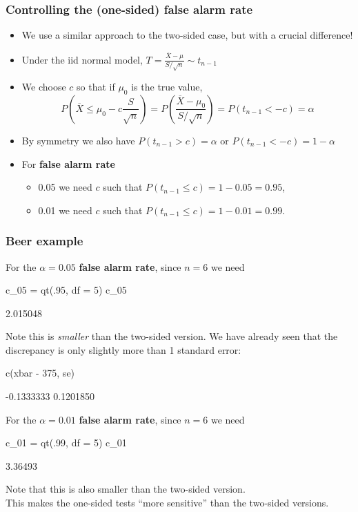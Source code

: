 \documentclass[a4paper]{article}
\begin{document}
\subsubsection{Controlling the (one-sided) false alarm rate}
\begin{itemize}
	\item We use a similar approach to the two-sided case, but with a crucial difference!
	\item Under the iid normal model, \( T = \frac{\overline{X} - \mu}{S / \sqrt{n}} \sim t_{n-1} \)
	\item We choose \( c \) so that if \( \mu_0 \) is the true value,
	\[
		P \left( \overline{X} \leq \mu_0 - c \frac{S}{\sqrt{n}} \right) = P \left( \frac{\overline{X} - \mu_0}{S / \sqrt{n}} \right) = P(t_{n-1} < -c) = \alpha
	\]
	\item By symmetry we also have \( P(t_{n-1} > c) = \alpha \) or \( P(t_{n-1} < -c) = 1 -\alpha \) 
	\item For \textcolor{mygreen}{\textbf{false alarm rate}}
	\begin{itemize}
		\item 0.05 we need \( c \) such that \( P(t_{n-1} \leq c) = 1-0.05 = 0.95 \),
		\item 0.01 we need \( c \) such that \( P(t_{n-1} \leq c) = 1-0.01 = 0.99 \).
	\end{itemize}
\end{itemize}
\subsubsection{Beer example}
For the \( \alpha = 0.05 \) \textcolor{mygreen}{\textbf{false alarm rate}}, since \( n = 6 \) we need
\begin{Schunk}
\begin{Sinput}
c_05 = qt(.95, df = 5)
c_05
\end{Sinput}
\begin{Soutput}
[1] 2.015048
\end{Soutput}
\end{Schunk}
Note this is \textit{smaller} than the two-sided version.
We have already seen that the discrepancy is only slightly more than 1 standard error:
\begin{Schunk}
\begin{Sinput}
c(xbar - 375, se)
\end{Sinput}
\begin{Soutput}
[1] -0.1333333  0.1201850
\end{Soutput}
\end{Schunk}
For the \( \alpha = 0.01 \) \textcolor{mygreen}{\textbf{false alarm rate}}, since \( n = 6 \) we need
\begin{Schunk}
\begin{Sinput}
c_01 = qt(.99, df = 5)
c_01
\end{Sinput}
\begin{Soutput}
[1] 3.36493
\end{Soutput}
\end{Schunk}
Note that this is also smaller than the two-sided version.\\
This makes the one-sided tests ``more sensitive'' than the two-sided versions.
\end{document}
